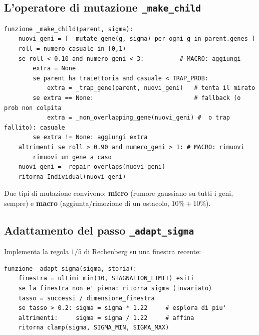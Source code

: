 \documentclass[11pt,a4paper]{report}
\begin{document}
\subsection{L'operatore di mutazione \texttt{\_make\_child}}
\begin{lstlisting}[style=pseudo]
funzione _make_child(parent, sigma):
    nuovi_geni = [ _mutate_gene(g, sigma) per ogni g in parent.genes ]
    roll = numero casuale in [0,1)
    se roll < 0.10 and numero_geni < 3:          # MACRO: aggiungi
        extra = None
        se parent ha traiettoria and casuale < TRAP_PROB:
            extra = _trap_gene(parent, nuovi_geni)   # tenta il mirato
        se extra == None:                            # fallback (o prob non colpita
            extra = _non_overlapping_gene(nuovi_geni) #  o trap fallito): casuale
        se extra != None: aggiungi extra
    altrimenti se roll > 0.90 and numero_geni > 1: # MACRO: rimuovi
        rimuovi un gene a caso
    nuovi_geni = _repair_overlaps(nuovi_geni)
    ritorna Individual(nuovi_geni)
\end{lstlisting}
Due tipi di mutazione convivono: \textbf{micro} (rumore gaussiano su
tutti i geni, sempre) e \textbf{macro} (aggiunta/rimozione di un
ostacolo, $10\%+10\%$).

\subsection{Adattamento del passo \texttt{\_adapt\_sigma}}
Implementa la regola $1/5$ di Rechenberg su una finestra recente:
\begin{lstlisting}[style=pseudo]
funzione _adapt_sigma(sigma, storia):
    finestra = ultimi min(10, STAGNATION_LIMIT) esiti
    se la finestra non e' piena: ritorna sigma (invariato)
    tasso = successi / dimensione_finestra
    se tasso > 0.2: sigma = sigma * 1.22     # esplora di piu'
    altrimenti:     sigma = sigma / 1.22     # affina
    ritorna clamp(sigma, SIGMA_MIN, SIGMA_MAX)
\end{lstlisting}
\end{document}
